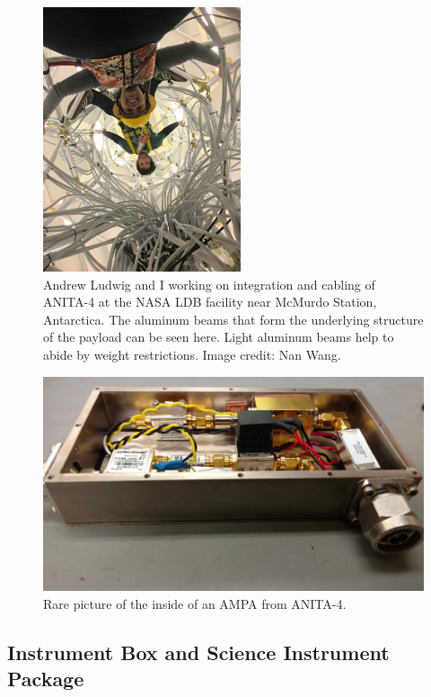 \begin{figure}
\centering
\includegraphics[width=0.52\textwidth]{figures/beams.jpg}
\caption{Andrew Ludwig and I working on integration and cabling of ANITA-4 at the NASA LDB facility near McMurdo Station, Antarctica. The aluminum beams that form the underlying structure of the payload can be seen here. Light aluminum beams help to abide by weight restrictions. Image credit: Nan Wang.}
\label{hanging}
\end{figure}

\begin{figure}
\centering
\includegraphics[width=1.0\textwidth]{figures/ampa.jpg}
\caption{Rare picture of the inside of an AMPA from ANITA-4.}
\label{ampa}
\end{figure}

\subsection{Instrument Box and Science Instrument Package}
\label{box_sip}

